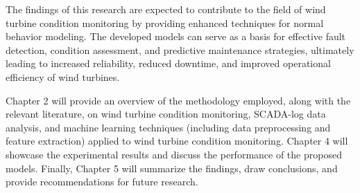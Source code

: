 \par The findings of this research are expected to contribute to the field of wind turbine condition monitoring by providing enhanced techniques for normal behavior modeling. 
The developed models can serve as a basis for effective fault detection, condition assessment, and predictive maintenance strategies, ultimately leading to increased reliability, reduced downtime, and improved operational efficiency of wind turbines.

\par Chapter 2 will provide an overview of the methodology employed, along with the relevant literature, on wind turbine condition monitoring, SCADA-log data analysis, and machine learning techniques 
(including data preprocessing and feature extraction) applied to wind turbine condition monitoring. 
Chapter 4 will showcase the experimental results and discuss the performance of the proposed models. 
Finally, Chapter 5 will summarize the findings, draw conclusions, and provide recommendations for future research.



